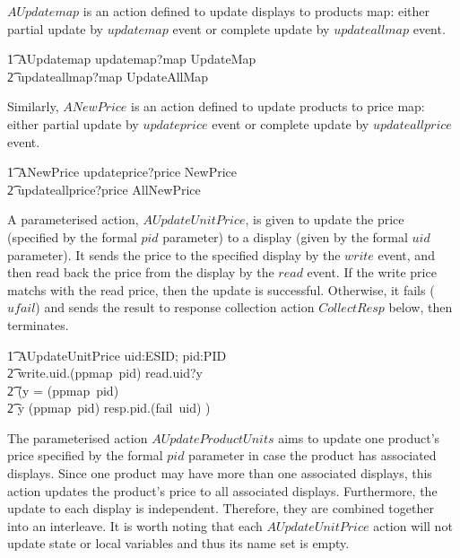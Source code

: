 $AUpdatemap$ is an action defined to update displays to products map: either partial update by $updatemap$ event or complete update by $updateallmap$ event.
\begin{circusaction}
        \t1 AUpdatemap \circdef updatemap?map \then \lschexpract UpdateMap \rschexpract \\
            \t2 \extchoice updateallmap?map \then \lschexpract UpdateAllMap \rschexpract \\
\end{circusaction}
Similarly, $ANewPrice$ is an action defined to update products to price map: either partial update by $updateprice$ event or complete update by $updateallprice$ event.
\begin{circusaction}
        \t1 ANewPrice \circdef updateprice?price \then \lschexpract NewPrice \rschexpract \\
            \t2 \extchoice updateallprice?price \then \lschexpract AllNewPrice \rschexpract \\
\end{circusaction}
A parameterised action, $AUpdateUnitPrice$, is given to update the price (specified by the formal $pid$ parameter) to a  display (given by the formal $uid$ parameter). It sends the price to the specified display by the $write$ event, and then read back the price from the display by the $read$ event. If the write price matchs with the read price, then the update is successful. Otherwise, it fails ($ufail$) and sends the result to response collection action $CollectResp$ below, then terminates. 
\begin{circusaction}
        \t1 AUpdateUnitPrice \circdef uid:ESID; pid:PID \circspot \\
            \t2 write.uid.(ppmap~pid) \then read.uid?y \then \\
            \t2 (\lcircguard y = (ppmap~pid) \rcircguard \circguard \Skip \\
            \t2 \extchoice \lcircguard y \neq (ppmap~pid) \rcircguard \circguard resp.pid.(fail~uid) \then \Skip) \\
\end{circusaction}
The parameterised action $AUpdateProductUnits$ aims to update one product's price specified by the formal $pid$ parameter in case the product has associated displays. Since one product may have more than one associated displays, this action updates the product's price to all associated displays. Furthermore, the update to each display is independent. Therefore, they are combined together into an interleave. It is worth noting that each $AUpdateUnitPrice$ action will not update state or local variables and thus its name set is empty. 
